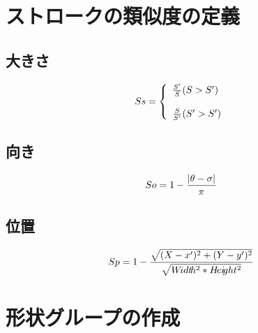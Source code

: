 
\section{ストロークの類似度の定義}

\subsection{大きさ}
\begin{equation}
S{\scriptsize s} = \left \{
\begin{array}{l}
\frac{S'}{S} (S>S') \\\\
\frac{S}{S'} (S'>S')
\end{array}
\right.
\end{equation}


\subsection{向き}
\begin{equation}
S{\scriptsize o} = 1 - \frac{|\theta - \sigma|}{\pi}
\end{equation}


\subsection{位置}
\begin{equation}
S{\scriptsize p} = 1 - \frac{\sqrt{(X - x')^2 + (Y - y')^2}}{\sqrt{W\!idt\!h^2 * H\!ei\!ght^2}}
\end{equation}


\section{形状グループの作成}

